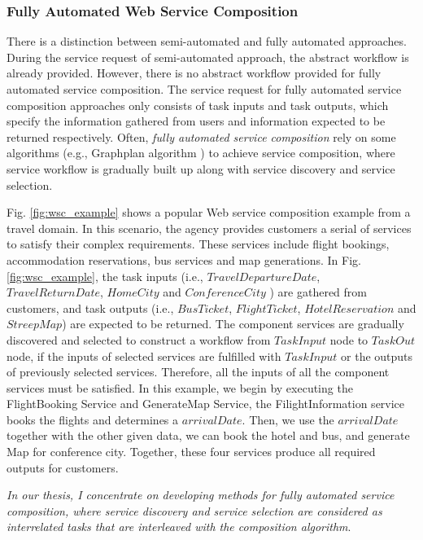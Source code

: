 \subsubsection{Fully Automated Web Service Composition}\label{fully}

There is a distinction between semi-automated and fully automated approaches. During the service request of semi-automated approach, the abstract workflow is already provided. However, there is no abstract workflow provided for fully automated service composition. The service request for fully automated service composition approaches only consists of task inputs and task outputs, which specify the information gathered from users and information expected to be returned respectively. Often, \emph{fully automated service composition} rely on some algorithms (e.g., Graphplan algorithm \cite{blum1997fast}) to achieve service composition, where service workflow is gradually built up along with service discovery and service selection. 

Fig. \ref{fig:wsc_example} shows a popular Web service composition example from a travel domain. In this scenario, the agency provides customers a serial of services to satisfy their complex requirements. These services include flight bookings, accommodation reservations, bus services and map generations. In Fig. \ref{fig:wsc_example}, the task inputs (i.e., $TravelDepartureDate$, $TravelReturnDate$, $HomeCity$ and $ConferenceCity$ ) are gathered from customers, and task outputs (i.e., $BusTicket$, $FlightTicket$, $HotelReservation$ and $StreepMap$) are expected to be returned. The component services are gradually discovered and selected to construct a workflow from $TaskInput$ node to $TaskOut$ node, if the inputs of selected services are fulfilled with $TaskInput$ or the outputs of previously selected services. Therefore, all the inputs of all the component services must be satisfied. In this example, we begin by executing the FlightBooking Service and GenerateMap Service, the FilightInformation service books the flights and determines a $arrivalDate$. Then, we use the $arrivalDate$ together with the other given data, we can book the hotel and bus, and generate Map for conference city. Together, these four services produce all required outputs for customers. 

\emph{In our thesis, I concentrate on developing methods for fully automated service composition, where service discovery and service selection are considered as interrelated tasks that are interleaved with the composition algorithm}. 

